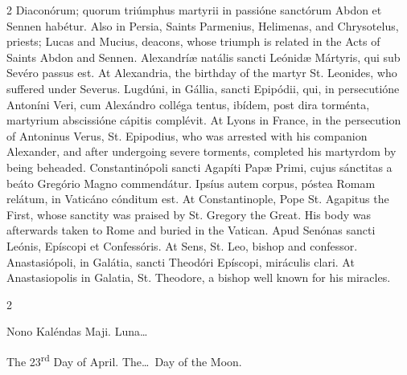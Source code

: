 \begin{paracol}{2}
 Diaconórum; quorum triúmphus martyrii in passióne sanctórum Abdon et Sennen 
 habétur.
\switchcolumn
{}
Also in Persia, Saints Parmenius, 
 Helimenas, and Chrysotelus, priests; Lucas and Mucius, deacons, whose 
 triumph is related in the Acts of Saints Abdon and Sennen.
\switchcolumn*
{}
Alexandríæ natális 
 sancti Leónidæ Mártyris, qui sub Sevéro passus est.
\switchcolumn
{}
At Alexandria, the birthday of the 
 martyr St. Leonides, who suffered under Severus.
\switchcolumn*
{}
Lugdúni, in Gállia, 
 sancti Epipódii, qui, in persecutióne Antoníni Veri, cum Alexándro colléga 
 tentus, ibídem, post dira torménta, martyrium abscissióne cápitis complévit.
\switchcolumn
{}
At Lyons in France, in the 
 persecution of Antoninus Verus, St. Epipodius, who was arrested with his 
 companion Alexander, and after undergoing severe torments, completed his 
 martyrdom by being beheaded.
\switchcolumn*
{}
Constantinópoli sancti 
 Agapíti Papæ Primi, cujus sánctitas a beáto Gregório Magno commendátur. 
 Ipsíus autem corpus, póstea Romam relátum, in Vaticáno cónditum est.
\switchcolumn
{}
At Constantinople, Pope St. 
 Agapitus the First, whose sanctity was praised by St. Gregory the Great. 
 His body was afterwards taken to Rome and buried in the Vatican.
\switchcolumn*
{}
Apud Senónas sancti 
 Leónis, Epíscopi et Confessóris.
\switchcolumn
{}
At Sens, St. Leo, bishop and 
 confessor.
\switchcolumn*
{}
Anastasiópoli, in 
 Galátia, sancti Theodóri Epíscopi, miráculis clari.
\switchcolumn
{}
At Anastasiopolis in Galatia, St. 
 Theodore, a bishop well known for his miracles.
\switchcolumn*
{}
\end{paracol}


\begin{paracol}{2}
\begin{center}{\color{gregoriocolor} Nono Kaléndas Maji. 
 Luna\dots\ }\end{center}
\switchcolumn
{}
\begin{center}{\color{gregoriocolor} The 
 23\textsuperscript{rd} Day of April. The\dots\ Day of the Moon.}\end{center}
\end{paracol}

